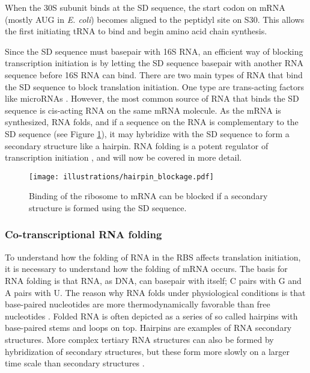 When the 30S subunit binds at the SD sequence, the start codon on mRNA (mostly
AUG in \textit{E. coli}) becomes aligned to the peptidyl site on S30. This
allows the first initiating tRNA to bind and begin amino acid chain synthesis.

Since the SD sequence must basepair with 16S RNA, an efficient way of blocking
transcription initiation is by letting the SD sequence basepair with another
RNA sequence before 16S RNA can bind. There are two main types of RNA that bind
the SD sequence to block translation initiation. One type are trans-acting
factors like microRNAs \cite{storz_controlling_2004}. However, the most common
source of RNA that binds the SD sequence is cis-acting RNA on the same mRNA
molecule. As the mRNA is synthesized, RNA folds, and if a sequence on the RNA
is complementary to the SD sequence (see Figure \ref{fig:hairpin_blockage}), it
may hybridize with the SD sequence to form a secondary structure like a
hairpin. RNA folding is a potent regulator of transcription initiation
\cite{hall_role_1982, de_smit_secondary_1990}, and will now be covered in more
detail.

\begin{figure}[h]
	\begin{center}
		\texttt{[image: illustrations/hairpin\_blockage.pdf]}
	\end{center}
	\caption{Binding of the ribosome to mRNA can be blocked if a secondary
	structure is formed using the SD sequence.}
	\label{fig:hairpin_blockage}
\end{figure}

\subsubsection{Co-transcriptional RNA folding}
To understand how the folding of RNA in the RBS affects translation initiation,
it is necessary to understand how the folding of mRNA occurs. The basis for RNA
folding is that RNA, as DNA, can basepair with itself; C pairs with G and A
pairs with U. The reason why RNA folds under physiological conditions is that
base-paired nucleotides are more thermodynamically favorable than free
nucleotides \cite{onoa_rna_2004}. Folded RNA is often depicted as a series of
so called hairpins with base-paired stems and loops on top. Hairpins are
examples of RNA secondary structures. More complex tertiary RNA structures can
also be formed by hybridization of secondary structures, but these form more
slowly on a larger time scale than secondary structures \cite{onoa_rna_2004}.

